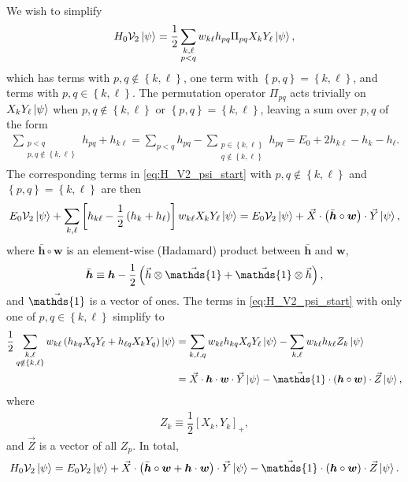\documentclass[nofootinbib,notitlepage,11pt]{revtex4-2}
\newcommand{\f}[2]{\dfrac{#1}{#2}} %
\newcommand{\p}[1]{\left(#1\right)} %
\renewcommand{\sp}[1]{\left[#1\right]} %
\renewcommand{\set}[1]{\left\{#1\right\}} %
\renewcommand{\c}{\cdot} %
\renewcommand{\oc}{\circ} %
\newcommand{\m}{\bm} %
\renewcommand{\v}{\vec} %
\newcommand{\1}{\mathds{1}}
\newcommand{\V}{\mathcal{V}}
\begin{document}
We wish to simplify
\begin{align}
  H_0 \V_2 \ket\psi
  = \f12 \sum_{\substack{k,\ell\\p<q}} w_{k\ell} h_{pq}
  \Pi_{pq} X_k Y_\ell \ket\psi,
  \label{eq:H_V2_psi_start}
\end{align}
which has terms with $p,q\notin\set{k,\ell}$, one term with
$\set{p,q}=\set{k,\ell}$, and terms with $p,q\in\set{k,\ell}$.  The
permutation operator $\Pi_{pq}$ acts trivially on
$X_k Y_\ell \ket\psi$ when $p,q\notin\set{k,\ell}$ or
$\set{p,q}=\set{k,\ell}$, leaving a sum over $p,q$ of the form
\begin{align}
  \sum_{\substack{p<q\\p,q\notin\set{k,\ell}}} h_{pq} + h_{k\ell}
  = \sum_{p<q} h_{pq}
  - \sum_{\substack{p\in\set{k,\ell}\\q\notin\set{k,\ell}}} h_{pq}
  = E_0 + 2 h_{k\ell} - h_k - h_\ell.
\end{align}
The corresponding terms in \eqref{eq:H_V2_psi_start} with
$p,q\notin\set{k,\ell}$ and $\set{p,q}=\set{k,\ell}$ are then
\begin{align}
  E_0 \V_2 \ket\psi + \sum_{k,\ell}
  \sp{h_{k\ell} - \f12\p{h_k+h_\ell}} w_{k\ell} X_k Y_\ell \ket\psi
  = E_0 \V_2 \ket\psi + \v X \c \p{\bar{\m h}\oc\m w} \c \v Y \ket\psi,
\end{align}
where $\bar{\m h}\oc\m w$ is an element-wise (Hadamard) product
between $\bar{\m h}$ and $\m w$,
\begin{align}
  \bar{\m h} \equiv \m h - \f12\p{\v h\otimes\v\1 + \v\1\otimes\v h},
\end{align}
and $\v\1$ is a vector of ones.  The terms in
\eqref{eq:H_V2_psi_start} with only one of $p,q\in\set{k,\ell}$
simplify to
\begin{align}
  \f12 \sum_{\substack{k,\ell\\q\notin\set{k,\ell}}} w_{k\ell}
  \p{h_{kq} X_q Y_\ell + h_{\ell q} X_k Y_q} \ket\psi
  &= \sum_{k,\ell,q} w_{k\ell} h_{kq} X_q Y_\ell \ket\psi
  - \sum_{k,\ell} w_{k\ell} h_{k\ell} Z_k \ket\psi \\
  &= \v X \c\m h \c\m w\c\v Y \ket\psi
  - \v\1 \c \p{\m h\oc\m w}\c \v Z \ket\psi,
\end{align}
where
\begin{align}
  Z_k \equiv \f12 \sp{X_k, Y_k}_+,
\end{align}
and $\v Z$ is a vector of all $Z_p$.  In total,
\begin{align}
  H_0 \V_2 \ket\psi
  = E_0 \V_2 \ket\psi
  + \v X \c \p{\bar{\m h}\oc\m w + \m h\c\m w} \c \v Y \ket\psi
  - \v\1 \c \p{\m h\oc\m w}\c \v Z \ket\psi.
\end{align}
\end{document}

